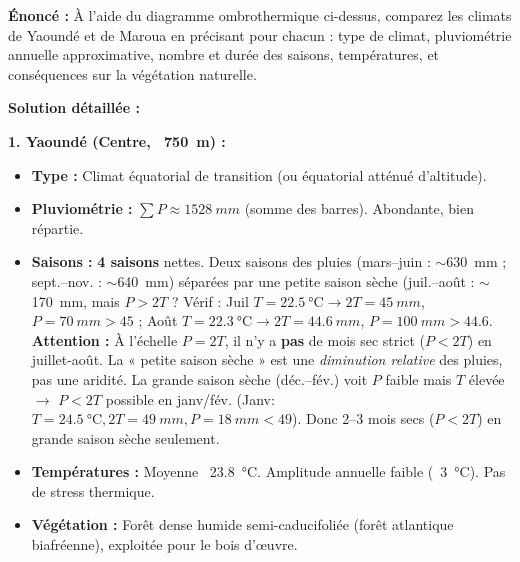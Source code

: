 \documentclass[11pt]{article}
\begin{document}
\begin{exoresolu}
\textbf{Énoncé :} À l'aide du diagramme ombrothermique ci-dessus, comparez les climats de Yaoundé et de Maroua en précisant pour chacun : type de climat, pluviométrie annuelle approximative, nombre et durée des saisons, températures, et conséquences sur la végétation naturelle.

\textbf{Solution détaillée :}

\noindent\textbf{1. Yaoundé (Centre, ~\SI{750}{m}) :}
\begin{itemize}
    \item \textbf{Type :} Climat équatorial de transition (ou équatorial atténué d'altitude).
    \item \textbf{Pluviométrie :} $\sum P \approx \SI{1 528}{mm}$ (somme des barres). Abondante, bien répartie.
    \item \textbf{Saisons :} \textbf{4 saisons} nettes. Deux saisons des pluies (mars--juin : $\sim$\SI{630}{mm} ; sept.--nov. : $\sim$\SI{640}{mm}) séparées par une petite saison sèche (juil.--août : $\sim$\SI{170}{mm}, mais $P > 2T$ ? Vérif : Juil $T=\SI{22.5}{\celsius} \rightarrow 2T=\SI{45}{mm}$, $P=\SI{70}{mm} > 45$ ; Août $T=\SI{22.3}{\celsius} \rightarrow 2T=\SI{44.6}{mm}$, $P=\SI{100}{mm} > 44.6$. \textbf{Attention :} À l'échelle $P=2T$, il n'y a \textbf{pas} de mois sec strict ($P < 2T$) en juillet-août. La « petite saison sèche » est une \emph{diminution relative} des pluies, pas une aridité. La grande saison sèche (déc.--fév.) voit $P$ faible mais $T$ élevée $\rightarrow$ $P < 2T$ possible en janv/fév. (Janv: $T=\SI{24.5}{\celsius}, 2T=\SI{49}{mm}, P=\SI{18}{mm} < 49$). Donc 2--3 mois secs ($P<2T$) en grande saison sèche seulement.
    \item \textbf{Températures :} Moyenne ~\SI{23,8}{\celsius}. Amplitude annuelle faible (~\SI{3}{\celsius}). Pas de stress thermique.
    \item \textbf{Végétation :} Forêt dense humide semi-caducifoliée (forêt atlantique biafréenne), exploitée pour le bois d'œuvre.
\end{itemize}


\end{exoresolu}
\end{document}
